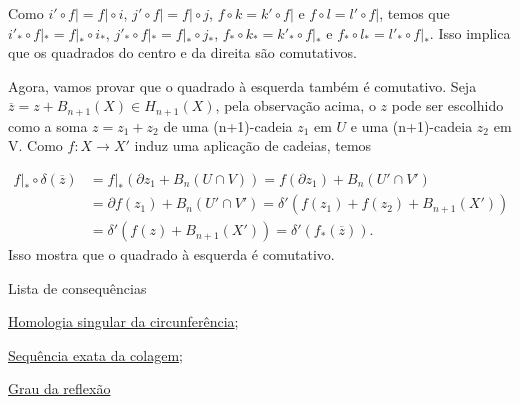 \begin{dem}
    Como $i'\circ f|=f|\circ i$, $j'\circ f|=f|\circ j$, $f\circ k=k'\circ f|$ e $f\circ l=l'\circ f|$, temos que $i'_*\circ f|_*=f|_*\circ i_*$, $j'_*\circ f|_*=f|_*\circ j_*$, $f_*\circ k_*=k'_*\circ f|_*$ e $f_*\circ l_*=l'_*\circ f|_*$. Isso implica que os quadrados do centro e da direita são comutativos.

    Agora, vamos provar que o quadrado à esquerda também é comutativo. Seja $\overline{z}=z+B_{n+1}(X)\in H_{n+1}(X)$, pela observação acima, o $z$ pode ser escolhido como a soma $z=z_1+z_2$ de uma (n+1)-cadeia $z_1$ em $U$ e uma (n+1)-cadeia $z_2$ em V. Como $f:X\rightarrow X'$ induz uma aplicação de cadeias, temos 

    \begin{align*}
        f|_*\circ \delta(\overline{z}) & =f|_*(\partial z_1+B_{n}(U\cap V))=f(\partial z_1)+B_n(U'\cap V')\\
        &=\partial f(z_1)+B_n(U'\cap V')=\delta'(f(z_1)+f(z_2)+B_{n+1}(X'))\\
        &=\delta'(f(z)+B_{n+1}(X'))=\delta'(f_*(\overline{z})).
    \end{align*}
    Isso mostra que o quadrado à esquerda é comutativo.
\end{dem}
\begin{titlemize}{Lista de consequências}
    \item \hyperref[homologia-singular-de-S1-prop]{Homologia singular da circunferência};\\
    \item \hyperref[sequencia-exata-da-colagem-prop]{Sequência exata da colagem};\\
    \item \hyperref[grau-da-reflexao-prop]{Grau da reflexão}
\end{titlemize}
